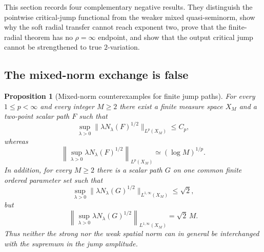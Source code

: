 \documentclass[11pt]{article}
\numberwithin{equation}{section}
\newtheorem{proposition}[theorem]{Proposition}
\theoremstyle{remark}
\theoremstyle{definition}
\begin{document}
This section records four complementary negative results.  They distinguish
the pointwise critical-jump functional from the weaker mixed quasi-seminorm,
show why the soft radial transfer cannot reach exponent two, prove that the
finite-radial theorem has no $\rho=\infty$ endpoint, and show that the output
critical jump cannot be strengthened to true $2$-variation.

\subsection{The mixed-norm exchange is false}

\begin{proposition}[Mixed-norm counterexamples for finite jump paths]
\label{prop:mixed-norm-counterexample}
For every $1\le p<\infty$ and every integer $M\ge2$ there exist a finite
measure space $X_M$ and a two-point scalar path $F$ such that
\begin{equation}\label{eq:mixed-outer-bounded}
 \sup_{\lambda>0}\|\lambda N_\lambda(F)^{1/2}\|_{L^p(X_M)}\le C_p,
\end{equation}
whereas
\begin{equation}\label{eq:mixed-inner-growth}
 \left\|\sup_{\lambda>0}\lambda N_\lambda(F)^{1/2}\right\|_{L^p(X_M)}
 \simeq(\log M)^{1/p}.
\end{equation}
In addition, for every $M\ge2$ there is a scalar path $G$ on one common
finite ordered parameter set such that
\begin{equation}\label{eq:mixed-weak-outer-bounded}
 \sup_{\lambda>0}
 \|\lambda N_\lambda(G)^{1/2}\|_{L^{1,\infty}(X_M)}\le\sqrt2,
\end{equation}
but
\begin{equation}\label{eq:mixed-weak-inner-growth}
 \left\|\sup_{\lambda>0}\lambda N_\lambda(G)^{1/2}
 \right\|_{L^{1,\infty}(X_M)}=\sqrt2\,M.
\end{equation}
Thus neither the strong nor the weak spatial norm can in general be
interchanged with the supremum in the jump amplitude.
\end{proposition}
\end{document}

